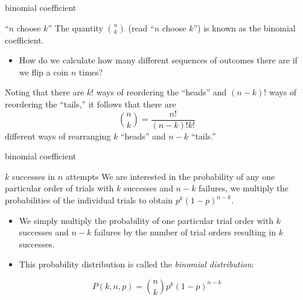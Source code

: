 \documentclass{beamer}
\begin{document}
\begin{frame}{binomial coefficient}

 \begin{mybluebox}{``$n$ choose $k$''}
The quantity $ \binom{n}{k} $ (read ``$n$ choose $k$'') is known as the binomial
coefficient.
\end{mybluebox}

 
\begin{itemize}
\item How do we calculate how many different sequences of outcomes there are if we flip a coin $n$ times?
\end{itemize}

  Noting that there are $k!$ ways of reordering the
``heads'' and $(n-k)!$ ways of reordering the ``tails,'' it follows
that there are
\begin{equation}
 \binom{n}{k} = \dfrac{n!}{\left(n-k\right)! k!}
\label{eq:binomial-coefficient}
\end{equation}
different ways of rearranging $k$ ``heads'' and $n-k$ ``tails.'' 

 
\end{frame}
\begin{frame}{binomial coefficient}
 \begin{mybluebox}{$k$ successes in $n$ attempts}
We are interested in the probability
of any one particular order of trials with $k$ successes and $n-k$
failures, we multiply the probabilities of the individual trials to
obtain $p^k(1-p)^{n-k}$. 
\end{mybluebox}

\begin{itemize}
\item We simply multiply the probability of one
particular trial order with $k$ successes and $n-k$ failures  by the number of trial
orders resulting in $k$ successes. 
\item This probability distribution is called the
\textit{binomial distribution}:
\end{itemize}



\begin{equation}
 \label{eq:dbinomial}
P(k,n,p) = \binom{n}{k} p^k\left(1-p\right)^{n-k}
\end{equation} 
 
\end{frame}
\end{document}

